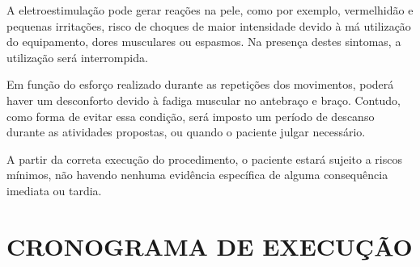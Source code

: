 \documentclass[rascunho,xindy]{fei}
\begin{document}
A eletroestimulação pode gerar reações na pele, como por exemplo, vermelhidão e pequenas irritações, risco de choques de maior intensidade devido à má utilização do equipamento, dores musculares ou espasmos. Na presença destes sintomas, a utilização será interrompida.

Em função do esforço realizado durante as repetições dos movimentos, poderá haver um desconforto devido à fadiga muscular no antebraço e braço. Contudo, como forma de evitar essa condição, será imposto um período de descanso durante as atividades propostas, ou quando o paciente julgar necessário.

A partir da correta execução do procedimento, o paciente estará sujeito a riscos mínimos, não havendo nenhuma evidência específica de alguma consequência imediata ou tardia.


\chapter{CRONOGRAMA DE EXECUÇÃO}


\end{document}

